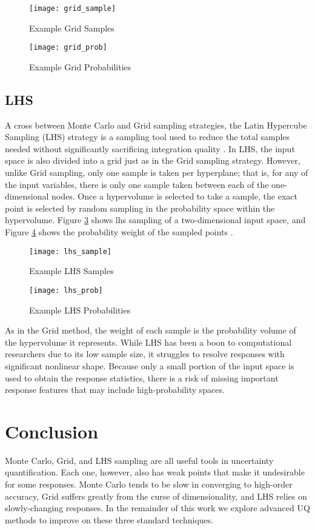 \begin{figure}[H]
  \centering
  \texttt{[image: grid\_sample]}
  \caption{Example Grid Samples \cite{raven}}
  \label{fig:grid sample}
\end{figure}
\begin{figure}[H]
  \centering
  \texttt{[image: grid\_prob]}
  \caption{Example Grid Probabilities \cite{raven}}
  \label{fig:grid prob}
\end{figure}


\subsection{LHS}
A cross between Monte Carlo and Grid sampling strategies, the Latin Hypercube Sampling (LHS) strategy 
is a sampling tool used to reduce
the total samples needed without significantly sacrificing integration quality \cite{lhs}.  In LHS, the input
space is also divided into a grid just as in the Grid sampling strategy.  However, unlike Grid sampling, only
one sample is taken per hyperplane; that is, for any of the input variables, there is only one sample taken
between each of the one-dimensional nodes.  Once a hypervolume is selected to take a sample, the exact
point is selected by random sampling in the probability space within the hypervolume.
Figure \ref{fig:lhs sample}
shows lhs sampling of a two-dimensional input space, and Figure \ref{fig:lhs prob} shows the
probability weight of the sampled points \cite{raven}.

\begin{figure}[H]
  \centering
  \texttt{[image: lhs\_sample]}
  \caption{Example LHS Samples \cite{raven}}
  \label{fig:lhs sample}
\end{figure}
\begin{figure}[H]
  \centering
  \texttt{[image: lhs\_prob]}
  \caption{Example LHS Probabilities \cite{raven}}
  \label{fig:lhs prob}
\end{figure}

As in the Grid method, the weight of each sample is the probability volume of the hypervolume it represents.
While LHS has been a boon to computational researchers due to its low sample size, it struggles to resolve
responses with significant nonlinear shape.  Because only a small portion of the input space is used to obtain
the response statistics, there is a risk of missing important response features that may include
high-probability spaces.

\section{Conclusion}
Monte Carlo, Grid, and LHS sampling are all useful tools in uncertainty quantification.  Each one, however,
also has weak points that make it undesirable for some responses.  Monte Carlo tends to be slow in converging
to high-order accuracy, Grid suffers greatly from the curse of dimensionality, and LHS relies on
slowly-changing responses.  In the remainder of this work we explore advanced UQ methods to improve on these
three standard techniques.

